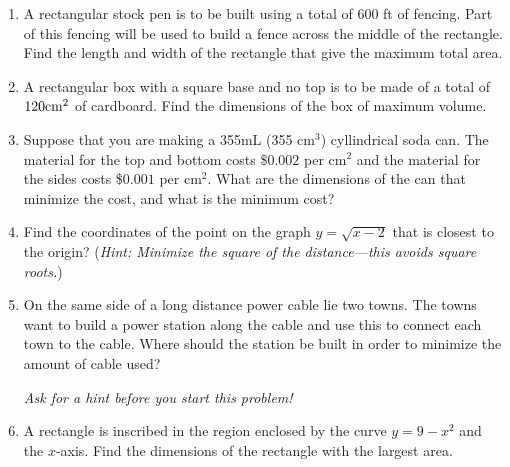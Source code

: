 \documentclass[11pt]{article}
\begin{document}
\drawtitle

\begin{enumerate}

\item A rectangular stock pen is to be built using a total of 600 ft
  of fencing. Part of this fencing will be used to build a fence
  across the middle of the rectangle. Find the length and width of the
  rectangle that give the maximum total area.

  \vfill

\item A rectangular box with a square base and no top is to be made of
  a total of $120\rm{cm}^2$ of cardboard.  Find the dimensions of the
  box of maximum volume.
  
  \vfill

\item Suppose that you are making a 355mL (355 cm$^3$) cyllindrical
  soda can.  The material for the top and bottom costs \$$0.002$ per
  cm$^2$ and the material for the sides costs \$$0.001$ per
  cm$^2$. What are the dimensions of the can that minimize the cost,
  and what is the minimum cost?

  \vfill

\item Find the coordinates of the point on the graph $y=\sqrt{x-2}$
  that is closest to the origin? (\textit{Hint: Minimize the square of
    the distance---this avoids square roots.})

  \vfill

\item On the same side of a long distance power cable lie two towns.
  The towns want to build a power station along the cable and use this
  to connect each town to the cable.  Where should the station be
  built in order to minimize the amount of cable used?
  \begin{center}

    \textit{Ask for a hint before you start this problem!}
  \end{center}

  \vfill

\item A rectangle is inscribed in the region enclosed by the curve
  $y=9-x^2$ and the $x$-axis.  Find the dimensions of the rectangle
  with the largest area.

\end{enumerate}
\end{document}

